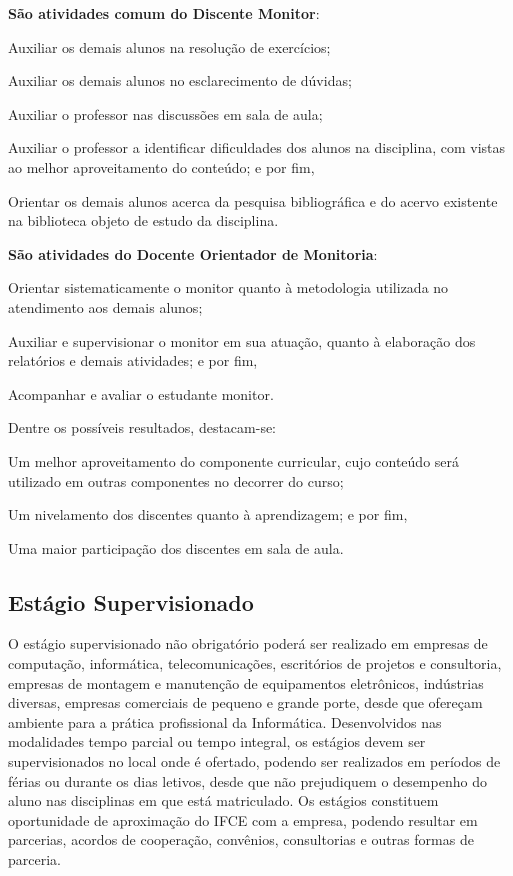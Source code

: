 \documentclass[
	12pt,				%
	openright,			%
	twoside,			%
	a4paper,			%
	chapter=TITLE,		%
	english,			%
	french,				%
	spanish,			%
	brazil,				%
	]{abntex2}
\begin{document}
\textbf{São atividades comum do Discente Monitor}:
\begin{alineas}
\item Auxiliar os demais alunos na resolução de exercícios;
\item Auxiliar os demais alunos no esclarecimento de dúvidas;
\item Auxiliar o professor nas discussões em sala de aula;
\item Auxiliar o professor a identificar dificuldades dos alunos na disciplina, com vistas ao melhor aproveitamento do conteúdo; e por fim,
\item Orientar os demais alunos acerca da pesquisa bibliográfica e do acervo existente na biblioteca objeto de estudo da disciplina.

\end{alineas}


\textbf{São atividades do Docente Orientador de Monitoria}:
\begin{alineas}
\item Orientar sistematicamente o monitor quanto à metodologia utilizada no atendimento aos demais alunos;
\item Auxiliar e supervisionar o monitor em sua atuação, quanto à elaboração dos relatórios e demais atividades; e por fim,
\item Acompanhar e avaliar o estudante monitor.
\end{alineas}

Dentre os possíveis resultados, destacam-se: 
\begin{alineas}
\item Um melhor aproveitamento do componente curricular, cujo conteúdo será utilizado em outras componentes no decorrer do curso;
\item Um nivelamento dos discentes quanto à aprendizagem; e por fim,
\item Uma maior participação dos discentes em sala de aula.
\end{alineas}



\subsection{Estágio Supervisionado}

O estágio supervisionado não obrigatório poderá ser realizado em empresas de computação, informática, telecomunicações, escritórios de projetos e consultoria, empresas de montagem e manutenção de equipamentos eletrônicos, indústrias diversas, empresas comerciais de pequeno e grande porte, desde que ofereçam ambiente para a prática profissional da Informática.  Desenvolvidos nas modalidades tempo parcial ou tempo integral, os estágios devem ser supervisionados no local onde é ofertado, podendo ser realizados em períodos de férias ou durante os dias letivos, desde que não prejudiquem o desempenho do aluno nas disciplinas em que está matriculado.
Os estágios constituem oportunidade de aproximação do IFCE com a empresa, podendo resultar em parcerias, acordos de cooperação, convênios, consultorias e outras formas de parceria.
\end{document}
